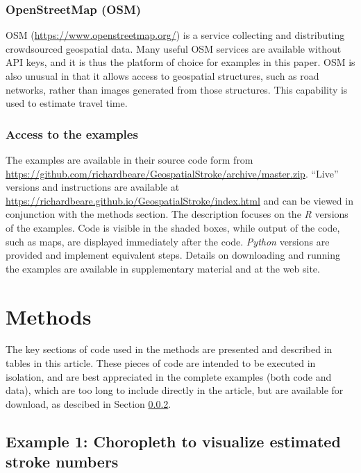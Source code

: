 \documentclass[utf8]{frontiersHLTH}
\begin{document}
\subsubsection{OpenStreetMap (OSM)}\label{openstreetmap-osm} 
OSM (\url{https://www.openstreetmap.org/}) is a service collecting and
distributing crowdsourced geospatial data. Many useful OSM services
are available without API keys, and it is thus the platform of choice
for examples in this paper. OSM is also unusual in that it allows
access to geospatial structures, such as road networks, rather than
images generated from those structures. This capability is used to
estimate travel time.

\subsubsection{Access to the examples}\label{access-to-the-examples} 
The examples are available in their source code form from
\url{https://github.com/richardbeare/GeospatialStroke/archive/master.zip}. ``Live''
versions and instructions are available at
\url{https://richardbeare.github.io/GeospatialStroke/index.html}
and can be viewed in conjunction with the methods section. The
description focuses on the {\em R} versions of the examples. Code is
visible in the shaded boxes, while output of the code, such as maps,
are displayed immediately after the code. {\em Python} versions are
provided and implement equivalent steps. Details on downloading and
running the examples are available in supplementary material and at
the web site.

\section{Methods}\label{methods}

The key sections of code used in the methods are presented and
described in tables in this article. These pieces of code are intended
to be executed in isolation, and are best appreciated in the complete
examples (both code and data), which are too long to include directly
in the article, but are available for download, as descibed in Section
\ref{access-to-the-examples}.

\subsection{Example 1: Choropleth to visualize estimated stroke numbers}\label{example-1-choropleth-to-visualize-estimated-stroke-numbers} 
\end{document}
